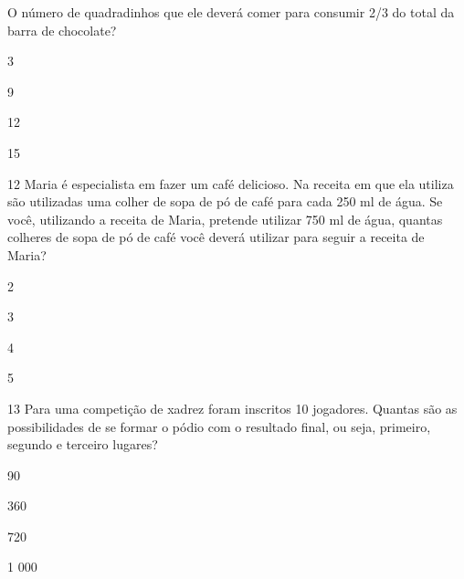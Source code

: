 O número de quadradinhos que ele deverá comer para consumir 2/3 do total
da barra de chocolate?

\begin{escolha}
\item
  3
\item
  9
\item
  12
\item
  15
\end{escolha}


\num{12} Maria é especialista em fazer um café delicioso. Na receita em que
ela utiliza são utilizadas uma colher de sopa de pó de café para cada
250 ml de água. Se você, utilizando a receita de Maria, pretende
utilizar 750 ml de água, quantas colheres de sopa de pó de café você
deverá utilizar para seguir a receita de Maria?

\begin{escolha}
\item
  2
\item
  3
\item
  4
\item
  5
\end{escolha}


\num{13} Para uma competição de xadrez foram inscritos 10 jogadores.
Quantas são as possibilidades de se formar o pódio com o resultado
final, ou seja, primeiro, segundo e terceiro lugares?

\begin{escolha}
\item
  90
\item
  360
\item
  720
\item
  1 000
\end{escolha}


